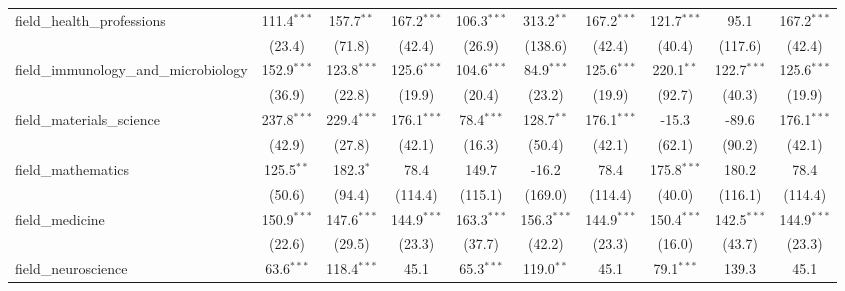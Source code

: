 \begin{tabular}{lccccccccc}
   field\_health\_professions                                  & 111.4$^{***}$  & 157.7$^{**}$    & 167.2$^{***}$  & 106.3$^{***}$ & 313.2$^{**}$  & 167.2$^{***}$  & 121.7$^{***}$ & 95.1            & 167.2$^{***}$\\   
                                                               & (23.4)         & (71.8)          & (42.4)         & (26.9)        & (138.6)       & (42.4)         & (40.4)        & (117.6)         & (42.4)\\   
   field\_immunology\_and\_microbiology                        & 152.9$^{***}$  & 123.8$^{***}$   & 125.6$^{***}$  & 104.6$^{***}$ & 84.9$^{***}$  & 125.6$^{***}$  & 220.1$^{**}$  & 122.7$^{***}$   & 125.6$^{***}$\\   
                                                               & (36.9)         & (22.8)          & (19.9)         & (20.4)        & (23.2)        & (19.9)         & (92.7)        & (40.3)          & (19.9)\\   
   field\_materials\_science                                   & 237.8$^{***}$  & 229.4$^{***}$   & 176.1$^{***}$  & 78.4$^{***}$  & 128.7$^{**}$  & 176.1$^{***}$  & -15.3         & -89.6           & 176.1$^{***}$\\   
                                                               & (42.9)         & (27.8)          & (42.1)         & (16.3)        & (50.4)        & (42.1)         & (62.1)        & (90.2)          & (42.1)\\   
   field\_mathematics                                          & 125.5$^{**}$   & 182.3$^{*}$     & 78.4           & 149.7         & -16.2         & 78.4           & 175.8$^{***}$ & 180.2           & 78.4\\   
                                                               & (50.6)         & (94.4)          & (114.4)        & (115.1)       & (169.0)       & (114.4)        & (40.0)        & (116.1)         & (114.4)\\   
   field\_medicine                                             & 150.9$^{***}$  & 147.6$^{***}$   & 144.9$^{***}$  & 163.3$^{***}$ & 156.3$^{***}$ & 144.9$^{***}$  & 150.4$^{***}$ & 142.5$^{***}$   & 144.9$^{***}$\\   
                                                               & (22.6)         & (29.5)          & (23.3)         & (37.7)        & (42.2)        & (23.3)         & (16.0)        & (43.7)          & (23.3)\\   
   field\_neuroscience                                         & 63.6$^{***}$   & 118.4$^{***}$   & 45.1           & 65.3$^{***}$  & 119.0$^{**}$  & 45.1           & 79.1$^{***}$  & 139.3           & 45.1\\   

\end{tabular}
